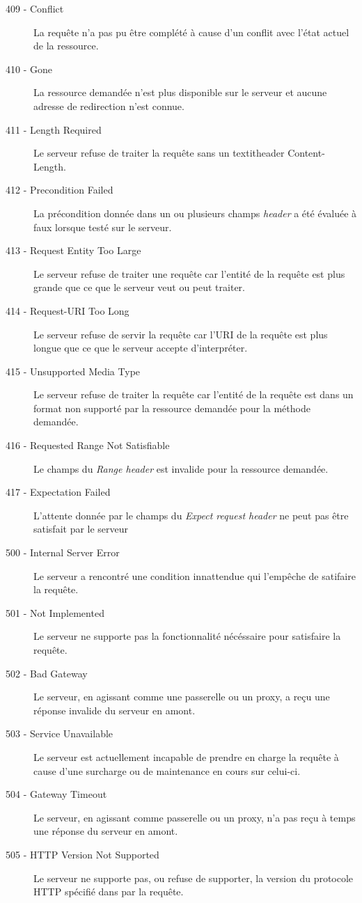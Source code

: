 \documentclass{scrreprt}
\begin{document}
\begin{description}
 \item [409 - Conflict] La requête n'a pas pu être complété à cause d'un conflit avec l'état actuel de la ressource.
 \item [410 - Gone] La ressource demandée n'est plus disponible sur le serveur et aucune adresse de redirection n'est connue.
 \item [411 - Length Required] Le serveur refuse de traiter la requête sans un textit{header} Content-Length.
 \item [412 - Precondition Failed] La précondition donnée dans un ou plusieurs champs \textit{header} a été évaluée à faux lorsque testé sur le serveur.
 \item [413 - Request Entity Too Large] Le serveur refuse de traiter une requête car l'entité de la requête est plus grande que ce que le serveur veut ou peut traiter.
 \item [414 - Request-URI Too Long] Le serveur refuse de servir la requête car l'URI de la requête est plus longue que ce que le serveur accepte d'interpréter.
 \item [415 - Unsupported Media Type] Le serveur refuse de traiter la requête car l'entité de la requête est dans un format non supporté par la ressource demandée pour la méthode demandée.
 \item [416 - Requested Range Not Satisfiable] Le champs du \textit{Range header} est invalide pour la ressource demandée.
 \item [417 - Expectation Failed] L'attente donnée par le champs du \textit{Expect request header} ne peut pas être satisfait par le serveur
 \item [500 - Internal Server Error] Le serveur a rencontré une condition innattendue qui l'empêche de satifaire la requête.
 \item [501 - Not Implemented] Le serveur ne supporte pas la fonctionnalité nécéssaire pour satisfaire la requête.
 \item [502 - Bad Gateway] Le serveur, en agissant comme une passerelle ou un proxy, a reçu une réponse invalide du serveur en amont.
 \item [503 - Service Unavailable] Le serveur est actuellement incapable de prendre en charge la requête à cause d'une surcharge ou de maintenance en cours sur celui-ci.
 \item [504 - Gateway Timeout] Le serveur, en agissant comme passerelle ou un proxy, n'a pas reçu à temps une réponse du serveur en amont.
 \item [505 - HTTP Version Not Supported] Le serveur ne supporte pas, ou refuse de supporter, la version du protocole HTTP spécifié dans par la requête.
 \end{description}\\
\end{document}
